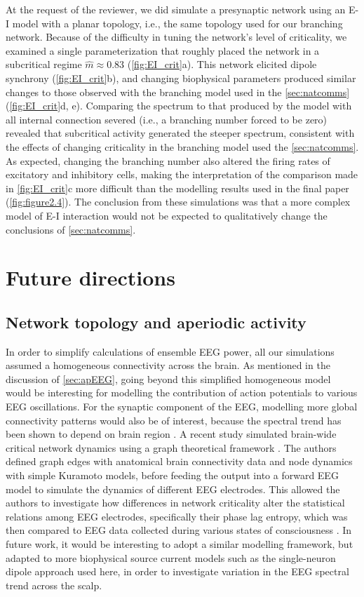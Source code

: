 At the request of the reviewer, we did simulate a presynaptic network using an E-I model with a planar topology, i.e., the same topology used for our branching network. Because of the difficulty in tuning the network's level of criticality, we examined a single parameterization that roughly placed the network in a subcritical regime $\hat{m}\approx0.83$ (\autoref{fig:EI_crit}a). This network elicited dipole synchrony (\autoref{fig:EI_crit}b), and changing biophysical parameters produced similar changes to those observed with the branching model used in the \autoref{sec:natcomms} (\autoref{fig:EI_crit}d, e). Comparing the spectrum to that produced by the model with all internal connection severed (i.e., a branching number forced to be zero) revealed that subcritical activity generated the steeper spectrum, consistent with the effects of changing criticality in the branching model used the \autoref{sec:natcomms}. As expected, changing the branching number also altered the firing rates of excitatory and inhibitory cells, making the interpretation of the comparison made in \autoref{fig:EI_crit}c more difficult than the modelling results used in the final paper (\autoref{fig:figure2.4}). The conclusion from these simulations was that a more complex model of E-I interaction would not be expected to qualitatively change the conclusions of \autoref{sec:natcomms}.

\section{Future directions}

\subsection{Network topology and aperiodic activity}
In order to simplify calculations of ensemble EEG power, all our simulations assumed a homogeneous connectivity across the brain. As mentioned in the discussion of \autoref{sec:apEEG}, going beyond this simplified homogeneous model would be interesting for modelling the contribution of action potentials to various EEG oscillations. For the synaptic component of the EEG, modelling more global connectivity patterns would also be of interest, because the spectral trend has been shown to depend on brain region \cite{He2010,Gao2020}. A recent study simulated brain-wide critical network dynamics using a graph theoretical framework \cite{LEE2019}. The authors defined graph edges with anatomical brain connectivity data and node dynamics with simple Kuramoto models, before feeding the output into a forward EEG model to simulate the dynamics of different EEG electrodes. This allowed the authors to investigate how differences in network criticality alter the statistical relations among EEG electrodes, specifically their phase lag entropy, which was then compared to EEG data collected during various states of consciousness  \cite{LEE2019}. In future work, it would be interesting to adopt a similar modelling framework, but adapted to more biophysical source current models such as the single-neuron dipole approach used here, in order to investigate variation in the EEG spectral trend across the scalp.

